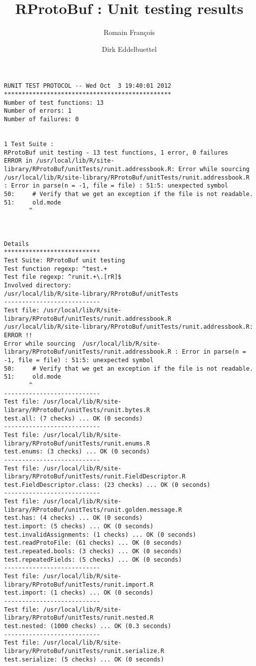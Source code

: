 \documentclass[10pt]{article}
\author{Romain Fran\c{c}ois \and Dirk Eddelbuettel}
\title{RProtoBuf : Unit testing results}
\begin{document}
\maketitle

\begin{verbatim}
RUNIT TEST PROTOCOL -- Wed Oct  3 19:40:01 2012 
*********************************************** 
Number of test functions: 13 
Number of errors: 1 
Number of failures: 0 

 
1 Test Suite : 
RProtoBuf unit testing - 13 test functions, 1 error, 0 failures
ERROR in /usr/local/lib/R/site-library/RProtoBuf/unitTests/runit.addressbook.R: Error while sourcing  /usr/local/lib/R/site-library/RProtoBuf/unitTests/runit.addressbook.R : Error in parse(n = -1, file = file) : 51:5: unexpected symbol
50:     # Verify that we get an exception if the file is not readable.
51:     old.mode
       ^



Details 
*************************** 
Test Suite: RProtoBuf unit testing 
Test function regexp: ^test.+ 
Test file regexp: ^runit.+\.[rR]$ 
Involved directory: 
/usr/local/lib/R/site-library/RProtoBuf/unitTests 
--------------------------- 
Test file: /usr/local/lib/R/site-library/RProtoBuf/unitTests/runit.addressbook.R 
/usr/local/lib/R/site-library/RProtoBuf/unitTests/runit.addressbook.R: ERROR !! 
Error while sourcing  /usr/local/lib/R/site-library/RProtoBuf/unitTests/runit.addressbook.R : Error in parse(n = -1, file = file) : 51:5: unexpected symbol
50:     # Verify that we get an exception if the file is not readable.
51:     old.mode
       ^
--------------------------- 
Test file: /usr/local/lib/R/site-library/RProtoBuf/unitTests/runit.bytes.R 
test.all: (7 checks) ... OK (0 seconds)
--------------------------- 
Test file: /usr/local/lib/R/site-library/RProtoBuf/unitTests/runit.enums.R 
test.enums: (3 checks) ... OK (0 seconds)
--------------------------- 
Test file: /usr/local/lib/R/site-library/RProtoBuf/unitTests/runit.FieldDescriptor.R 
test.FieldDescriptor.class: (23 checks) ... OK (0 seconds)
--------------------------- 
Test file: /usr/local/lib/R/site-library/RProtoBuf/unitTests/runit.golden.message.R 
test.has: (4 checks) ... OK (0 seconds)
test.import: (5 checks) ... OK (0 seconds)
test.invalidAssignments: (1 checks) ... OK (0 seconds)
test.readProtoFile: (61 checks) ... OK (0 seconds)
test.repeated.bools: (3 checks) ... OK (0 seconds)
test.repeatedFields: (5 checks) ... OK (0 seconds)
--------------------------- 
Test file: /usr/local/lib/R/site-library/RProtoBuf/unitTests/runit.import.R 
test.import: (1 checks) ... OK (0 seconds)
--------------------------- 
Test file: /usr/local/lib/R/site-library/RProtoBuf/unitTests/runit.nested.R 
test.nested: (1000 checks) ... OK (0.3 seconds)
--------------------------- 
Test file: /usr/local/lib/R/site-library/RProtoBuf/unitTests/runit.serialize.R 
test.serialize: (5 checks) ... OK (0 seconds)\end{verbatim}
\end{document}
